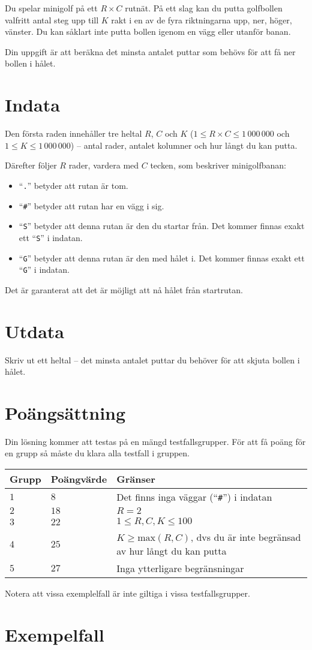

Du spelar minigolf på ett $R\times C$ rutnät.
På ett slag kan du putta golfbollen valfritt antal steg upp till $K$ rakt i en av de fyra riktningarna upp, ner, höger, vänster. Du kan såklart inte putta bollen igenom en vägg eller utanför banan.

Din uppgift är att beräkna det minsta antalet puttar som behövs för att få ner bollen i hålet.

\section*{Indata}
Den första raden innehåller tre heltal $R$, $C$ och $K$
($1 \le R\times C \le 1\,000\,000$ och $1\le K \le 1\,000\,000$) -- antal rader, antalet kolumner och hur långt du kan putta.

Därefter följer $R$ rader, vardera med $C$ tecken, som beskriver minigolfbanan:
\begin{itemize}
  \item ``\verb!.!'' betyder att rutan är tom.
  \item ``\verb!#!'' betyder att rutan har en vägg i sig.
  \item ``\verb!S!'' betyder att denna rutan är den du startar från. Det kommer finnas exakt ett ``\verb!S!'' i indatan.
  \item ``\verb!G!'' betyder att denna rutan är den med hålet i. Det kommer finnas exakt ett ``\verb!G!'' i indatan.
\end{itemize}

Det är garanterat att det är möjligt att nå hålet från startrutan.

\section*{Utdata}
Skriv ut ett heltal -- det minsta antalet puttar du behöver för att skjuta bollen i hålet.

\section*{Poängsättning}
Din lösning kommer att testas på en mängd testfallsgrupper.
För att få poäng för en grupp så måste du klara alla testfall i gruppen.

\noindent
\begin{tabular}{| l | l | l |}
  \hline
  Grupp & Poängvärde & Gränser \\ \hline
  $1$   & $8$        & Det finns inga väggar (``\verb!#!'') i indatan \\ \hline
  $2$   & $18$       & $R = 2$ \\ \hline
  $3$   & $22$       & $1\le R,C,K\le 100$ \\ \hline
  $4$   & $25$       & $K \ge \text{max}(R,C)$, dvs du är inte begränsad av hur långt du kan putta \\ \hline
  $5$   & $27$       & Inga ytterligare begränsningar \\ \hline
\end{tabular}

Notera att vissa exemplelfall är inte giltiga i vissa testfallsgrupper.

\section*{Exempelfall}
